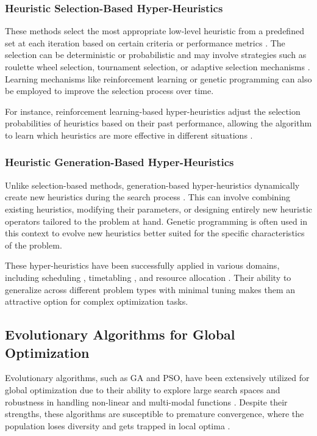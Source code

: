 \documentclass[conference]
{IEEEtran}
\begin{document}
\subsubsection{Heuristic Selection-Based Hyper-Heuristics}

These methods select the most appropriate low-level heuristic from a predefined set at each iteration based on certain criteria or performance metrics \cite{burke2010classification}. The selection can be deterministic or probabilistic and may involve strategies such as roulette wheel selection, tournament selection, or adaptive selection mechanisms \cite{cowan2009survey}. Learning mechanisms like reinforcement learning \cite{nareyek2003choosing} or genetic programming \cite{burke2009hyflex} can also be employed to improve the selection process over time.

For instance, reinforcement learning-based hyper-heuristics adjust the selection probabilities of heuristics based on their past performance, allowing the algorithm to learn which heuristics are more effective in different situations \cite{fialho2010analysis}.

\subsubsection{Heuristic Generation-Based Hyper-Heuristics}

Unlike selection-based methods, generation-based hyper-heuristics dynamically create new heuristics during the search process \cite{burke2007exploring}. This can involve combining existing heuristics, modifying their parameters, or designing entirely new heuristic operators tailored to the problem at hand. Genetic programming is often used in this context to evolve new heuristics better suited for the specific characteristics of the problem.

These hyper-heuristics have been successfully applied in various domains, including scheduling \cite{bilgin2007exam}, timetabling \cite{luke2011metaheuristics}, and resource allocation \cite{pisinger2007heuristic}. Their ability to generalize across different problem types with minimal tuning makes them an attractive option for complex optimization tasks.

\subsection{Evolutionary Algorithms for Global Optimization}

Evolutionary algorithms, such as GA and PSO, have been extensively utilized for global optimization due to their ability to explore large search spaces and robustness in handling non-linear and multi-modal functions \cite{eiben2003introduction}. Despite their strengths, these algorithms are susceptible to premature convergence, where the population loses diversity and gets trapped in local optima \cite{beyer2002evolution}.
\end{document}
